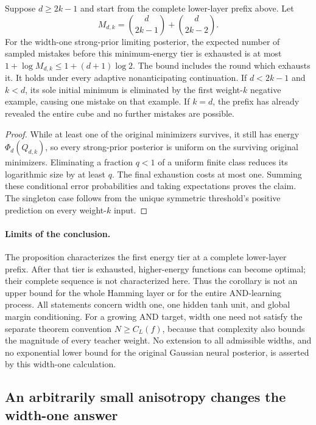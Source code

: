 \begin{corollary}\label{cor:and-first-tier}
Suppose $d\ge2k-1$ and start from the complete lower-layer prefix above.
Let
\[
 M_{d,k}=\binom d{2k-1}+\binom d{2k-2}.
\]
For the width-one strong-prior limiting posterior, the expected number
of sampled mistakes before this minimum-energy tier is exhausted is at
most $1+\log M_{d,k}\le1+(d+1)\log2$. The bound includes the round which exhausts
it. It holds under every adaptive nonanticipating continuation. If
$d<2k-1$ and $k<d$, its sole initial minimum is eliminated by the first
weight-$k$ negative example, causing one mistake on that example. If
$k=d$, the prefix has already revealed the entire cube and no further
mistakes are possible.
\end{corollary}
\begin{proof}
While at least one of the original minimizers survives, it still has
energy $\Phi_d(Q_{d,k})$, so every strong-prior posterior is uniform
on the surviving original minimizers. Eliminating a fraction $q<1$
of a uniform finite class reduces its logarithmic size by at least $q$.
The final exhaustion costs at most one. Summing these conditional error
probabilities and taking expectations proves the claim. The singleton
case follows from the unique symmetric threshold's positive prediction
on every weight-$k$ input.
\end{proof}

\paragraph{Limits of the conclusion.}
The proposition characterizes the first energy tier at a complete
lower-layer prefix. After that tier is exhausted, higher-energy
functions can become optimal; their complete sequence is not
characterized here. Thus the corollary is not an upper bound for the
whole Hamming layer or for the entire AND-learning process.
All statements concern width one, one hidden tanh unit, and global
margin conditioning. For a growing AND target, width one need not
satisfy the separate theorem convention $N\ge C_L(f)$, because that
complexity also bounds the magnitude of every teacher weight. No
extension to all admissible widths, and no exponential lower bound
for the original Gaussian neural posterior, is asserted by this width-one calculation.

\subsection{An arbitrarily small anisotropy changes the width-one answer}
\label{sec:and-anisotropy}

